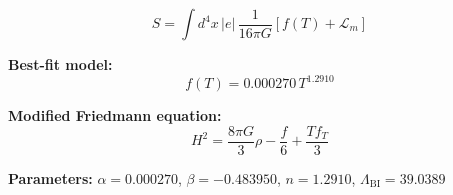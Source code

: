 
\begin{equation}
  S = \int d^4x \, |e| \, \frac{1}{16\pi G} \left[ f(T) + \mathcal{L}_m \right]
\end{equation}

\textbf{Best-fit model:}
\begin{equation}
  f(T) = 0.000270 \, T^{1.2910}
\end{equation}

\textbf{Modified Friedmann equation:}
\begin{equation}
  H^2 = \frac{8\pi G}{3} \rho - \frac{f}{6} + \frac{T f_T}{3}
\end{equation}

\textbf{Parameters:}
$\alpha = 0.000270$, \quad
$\beta = -0.483950$, \quad
$n = 1.2910$, \quad
$\Lambda_{\text{BI}} = 39.0389$